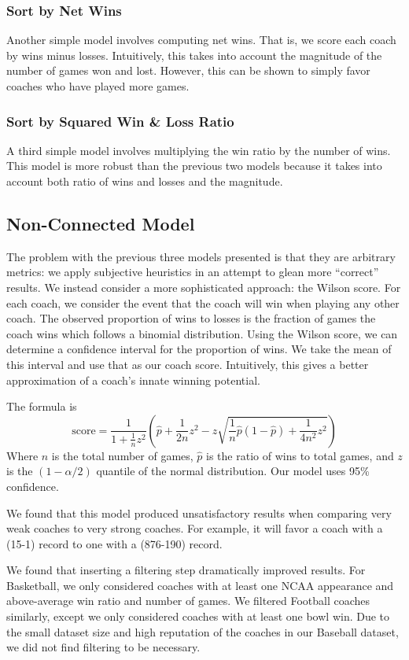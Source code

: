 \documentclass[titlepage,12pt]{article}
\begin{document}
\subsubsection{Sort by Net Wins}
Another simple model involves computing net wins. That is, we score each coach by wins minus losses. Intuitively, this takes into account the magnitude of the number of games won and lost. However, this can be shown to simply favor coaches who have played more games. 

\subsubsection{Sort by Squared Win \& Loss Ratio}
A third simple model involves multiplying the win ratio by the number of wins. This model is more robust than the previous two models because it takes into account both ratio of wins and losses and the magnitude.

\subsection{Non-Connected Model}
The problem with the previous three models presented is that they are arbitrary metrics: we apply subjective heuristics in an attempt to glean more ``correct'' results. We instead consider a more sophisticated approach: the Wilson score. For each coach, we consider the event that the coach will win when playing any other coach. The observed proportion of wins to losses is the fraction of games the coach wins which follows a binomial distribution. Using the Wilson score, we can determine a confidence interval for the proportion of wins. We take the mean of this interval and use that as our coach score. Intuitively, this gives a better approximation of a coach's innate winning potential.

The formula is
\[ \mathrm{score} = 
  \frac{1}{1 + \frac{1}{n} z^2}
  \left(
    \hat p + \frac{1}{2n} z^2 -
    z \sqrt{
      \frac{1}{n}\hat p \left(1 - \hat p\right) +
      \frac{1}{4n^2}z^2
    } 
   \right)
\]
Where $n$ is the total number of games, $\hat{p}$ is the ratio of wins to total games, and $z$ is the $(1 - \alpha/2)$ quantile of the normal distribution. Our model uses 95\% confidence.

We found that this model produced unsatisfactory results when comparing very weak coaches to very strong coaches. For example, it will favor a coach with a (15-1) record to one with a (876-190) record.

We found that inserting a filtering step dramatically improved results. For Basketball, we only considered coaches with at least one NCAA appearance and above-average win ratio and number of games. We filtered Football coaches similarly, except we only considered coaches with at least one bowl win. Due to the small dataset size and high reputation of the coaches in our Baseball dataset, we did not find filtering to be necessary.
\end{document}
